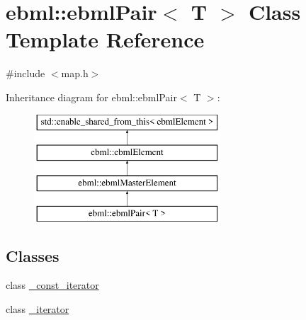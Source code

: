 \hypertarget{classebml_1_1ebmlPair}{}\section{ebml\+:\+:ebml\+Pair$<$ T $>$ Class Template Reference}
\label{classebml_1_1ebmlPair}


{\ttfamily \#include $<$map.\+h$>$}

Inheritance diagram for ebml\+:\+:ebml\+Pair$<$ T $>$\+:\begin{figure}[H]
\begin{center}
\leavevmode
\includegraphics[height=4.000000cm]{classebml_1_1ebmlPair}
\end{center}
\end{figure}
\subsection*{Classes}
\begin{DoxyCompactItemize}
\item 
class \mbox{\hyperlink{classebml_1_1ebmlPair_1_1__const__iterator}{\+\_\+const\+\_\+iterator}}
\item 
class \mbox{\hyperlink{classebml_1_1ebmlPair_1_1__iterator}{\+\_\+iterator}}
\end{DoxyCompactItemize}
